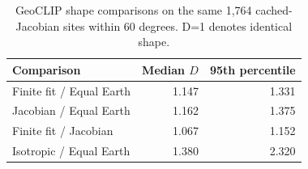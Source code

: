 \begin{table}[htbp]\centering\small
\caption{GeoCLIP shape comparisons on the same 1,764 cached-Jacobian sites within 60 degrees. D=1 denotes identical shape.}
\label{tab:shape}
\begin{tabular}{@{}lrr@{}}\toprule
Comparison&Median $D$&95th percentile\\\midrule
Finite fit / Equal Earth&1.147&1.331\\
Jacobian / Equal Earth&1.162&1.375\\
Finite fit / Jacobian&1.067&1.152\\
Isotropic / Equal Earth&1.380&2.320\\
\bottomrule\end{tabular}

\end{table}
